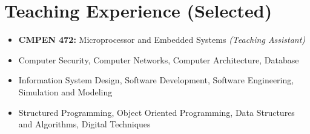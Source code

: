 \section{Teaching Experience (Selected)}

\begin{itemize}
    \item \textbf{CMPEN 472:} Microprocessor and Embedded Systems \textit{(Teaching Assistant)}
    \item Computer Security, Computer Networks, Computer Architecture, Database
    \item Information System Design, Software Development, Software Engineering, Simulation and Modeling
    \item Structured Programming, Object Oriented Programming, Data Structures and Algorithms, Digital Techniques
\end{itemize}

\endinput
